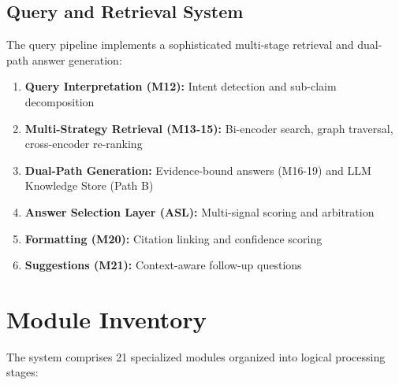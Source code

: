 \documentclass[11pt,a4paper]{article}
\begin{document}
\subsection{Query and Retrieval System}

The query pipeline implements a sophisticated multi-stage retrieval and dual-path answer generation:

\begin{enumerate}[leftmargin=*]
    \item \textbf{Query Interpretation (M12):} Intent detection and sub-claim decomposition
    \item \textbf{Multi-Strategy Retrieval (M13-15):} Bi-encoder search, graph traversal, cross-encoder re-ranking
    \item \textbf{Dual-Path Generation:} Evidence-bound answers (M16-19) and LLM Knowledge Store (Path B)
    \item \textbf{Answer Selection Layer (ASL):} Multi-signal scoring and arbitration
    \item \textbf{Formatting (M20):} Citation linking and confidence scoring
    \item \textbf{Suggestions (M21):} Context-aware follow-up questions
\end{enumerate}

\clearpage
\section{Module Inventory}

The system comprises 21 specialized modules organized into logical processing stages:
\end{document}
